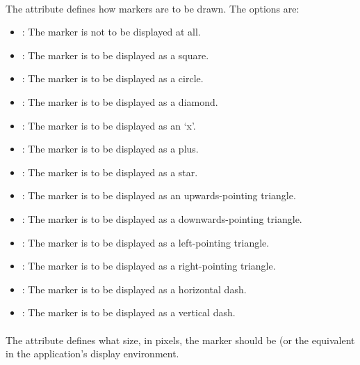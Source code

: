 \begin{blockChanged}
\paragraph*{}

The  attribute defines how markers are to be drawn.  The options are:

\begin{itemize}
        \item \textbf{}: The marker is not to be displayed at all.
        \item \textbf{}: The marker is to be displayed as a square.
        \item \textbf{}: The marker is to be displayed as a circle.
        \item \textbf{}: The marker is to be displayed as a diamond.
        \item \textbf{}: The marker is to be displayed as an `x'.
        \item \textbf{}: The marker is to be displayed as a plus.
        \item \textbf{}: The marker is to be displayed as a star.
        \item \textbf{}: The marker is to be displayed as an upwards-pointing triangle.
        \item \textbf{}: The marker is to be displayed as a downwards-pointing triangle.
        \item \textbf{}: The marker is to be displayed as a left-pointing triangle.
        \item \textbf{}: The marker is to be displayed as a right-pointing triangle.
        \item \textbf{}: The marker is to be displayed as a horizontal dash.
        \item \textbf{}: The marker is to be displayed as a vertical dash.
\end{itemize}

\paragraph*{}

The  attribute defines what size, in pixels, the marker should be (or the equivalent in the application's display environment.


\end{blockChanged}
